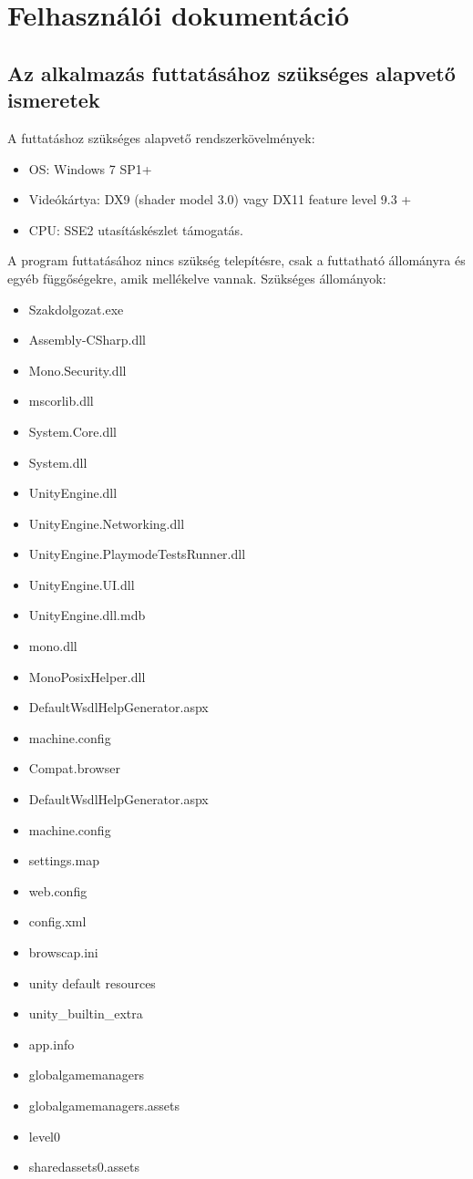 \chapter*{Felhasználói dokumentáció}

\section*{Az alkalmazás futtatásához szükséges alapvető ismeretek}

A futtatáshoz szükséges alapvető rendszerkövelmények:
\begin{itemize}
\item OS: Windows 7 SP1+
\item Videókártya: DX9 (shader model 3.0) vagy DX11 feature level 9.3 +
\item CPU: SSE2 utasításkészlet  támogatás.
\end{itemize}

\noindent A program futtatásához nincs szükség telepítésre, csak a futtatható állományra és egyéb függőségekre, amik mellékelve vannak.
\newline
\newline Szükséges állományok:
\begin{itemize}
\item Szakdolgozat.exe
\item Assembly-CSharp.dll
\item Mono.Security.dll
\item mscorlib.dll
\item System.Core.dll
\item System.dll
\item UnityEngine.dll
\item UnityEngine.Networking.dll
\item UnityEngine.PlaymodeTestsRunner.dll
\item UnityEngine.UI.dll
\item UnityEngine.dll.mdb
\item mono.dll
\item MonoPosixHelper.dll
\item DefaultWsdlHelpGenerator.aspx
\item machine.config
\item Compat.browser
\item DefaultWsdlHelpGenerator.aspx
\item machine.config
\item settings.map
\item web.config
\item config.xml
\item browscap.ini
\item unity default resources
\item unity\_builtin\_extra
\item app.info
\item globalgamemanagers
\item globalgamemanagers.assets
\item level0
\item sharedassets0.assets
\end{itemize}

